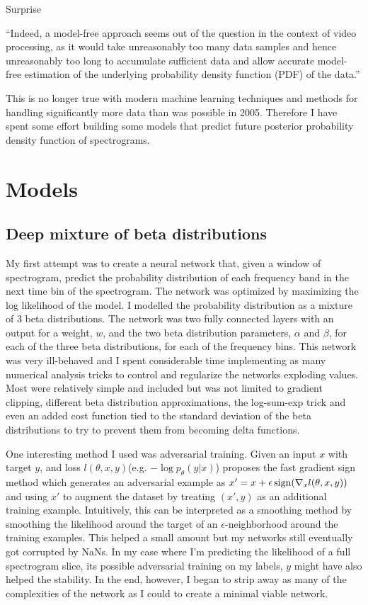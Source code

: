 Surprise

``Indeed, a model-free approach seems out of the question in the context of video processing, as it would take unreasonably too many data samples and hence unreasonably too long to accumulate sufficient data and allow accurate model-free estimation of the underlying probability density function (PDF) of the data.''\cite{itti2005principled}

This is no longer true with modern machine learning techniques and methods for handling significantly more data than was possible in 2005. Therefore I have spent some effort building some models that predict future posterior probability density function of spectrograms.

\section{Models}

\subsection{Deep mixture of beta distributions}
My first attempt was to create a neural network that, given a window of spectrogram, predict the probability distribution of each frequency band in the next time bin of the spectrogram. The network was optimized by maximizing the log likelihood of the model. I modelled the probability distribution as a mixture of 3 beta distributions. The network was two fully connected layers with an output for a weight, $w$, and the two beta distribution parameters, $\alpha$ and $\beta$, for each of the three beta distributions, for each of the frequency bins. This network was very ill-behaved and I spent considerable time implementing as many numerical analysis tricks to control and regularize the networks exploding values. Most were relatively simple and included but was not limited to gradient clipping, different beta distribution approximations, the log-sum-exp trick and even an added cost function tied to the standard deviation of the beta distributions to try to prevent them from becoming delta functions.

One interesting method I used was adversarial training\cite{goodfellow2014explaining,lakshminarayanan2017simple}. Given an input $x$ with target $y$, and loss $l(\theta, x, y)$(e.g. $-\log p_\theta(y|x)$) \cite{goodfellow2014explaining} proposes the fast gradient sign method which generates an adversarial example as $x' = x + \epsilon \operatorname{sign}(\nabla_x l(\theta, x, y))$ and using $x'$ to augment the dataset by treating $(x', y)$ as an additional training example. Intuitively, this can be interpreted as a smoothing method by smoothing the likelihood around the target of an $\epsilon$-neighborhood around the training examples. This helped a small amount but my networks still eventually got corrupted by NaNs. In my case where I'm predicting the likelihood of a full spectrogram slice, its possible adversarial training on my labels, $y$ might have also helped the stability. In the end, however, I began to strip away as many of the complexities of the network as I could to create a minimal viable network.

